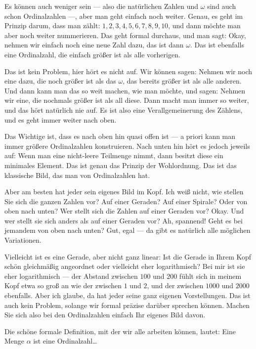 \begin{spoken-clean}[00:05:53 - 00:07:11]
Es können auch weniger sein --- also die natürlichen Zahlen und $\omega$ sind auch schon Ordinalzahlen ---, aber man geht einfach noch weiter. Genau, es geht im Prinzip darum, dass man zählt: $1, 2, 3, 4, 5, 6, 7, 8, 9, 10$, und dann möchte man aber noch weiter nummerieren. Das geht formal durchaus, und man sagt: Okay, nehmen wir einfach noch eine neue Zahl dazu, das ist dann $\omega$. Das ist ebenfalls eine Ordinalzahl, die einfach größer ist als alle vorherigen.

Das ist kein Problem, hier hört es nicht auf. Wir können sagen: Nehmen wir noch eine dazu, die noch größer ist als das $\omega$, das bereits größer ist als alle anderen. Und dann kann man das so weit machen, wie man möchte, und sagen: Nehmen wir eine, die nochmals größer ist als all diese. Dann macht man immer so weiter, und das hört natürlich nie auf. Es ist also eine Verallgemeinerung des Zählens, und es geht immer weiter nach oben.
\end{spoken-clean}

\begin{spoken-clean}[00:07:11 - 00:08:49]
Das Wichtige ist, dass es nach oben hin quasi offen ist --- a priori kann man immer größere Ordinalzahlen konstruieren. Nach unten hin hört es jedoch jeweils auf: Wenn man eine nicht-leere Teilmenge nimmt, dann besitzt diese ein minimales Element. Das ist genau das Prinzip der Wohlordnung. Das ist das klassische Bild, das man von Ordinalzahlen hat.

Aber am besten hat jeder sein eigenes Bild im Kopf. Ich weiß nicht, wie stellen Sie sich die ganzen Zahlen vor? Auf einer Geraden? Auf einer Spirale? Oder von oben nach unten? Wer stellt sich die Zahlen auf einer Geraden vor? Okay. Und wer stellt sie sich anders als auf einer Geraden vor? Ah, spannend! Geht es bei jemandem von oben nach unten? Gut, egal --- da gibt es natürlich alle möglichen Variationen.

Vielleicht ist es eine Gerade, aber nicht ganz linear: Ist die Gerade in Ihrem Kopf schön gleichmäßig angeordnet oder vielleicht eher logarithmisch? Bei mir ist sie eher logarithmisch --- der Abstand zwischen $100$ und $200$ fühlt sich in meinem Kopf etwa so groß an wie der zwischen $1$ und $2$, und der zwischen $1000$ und $2000$ ebenfalls. Aber ich glaube, da hat jeder seine ganz eigenen Vorstellungen. Das ist auch kein Problem, solange wir formal präzise darüber sprechen können. Machen Sie sich also bei den Ordinalzahlen einfach Ihr eigenes Bild davon.

Die schöne formale Definition, mit der wir alle arbeiten können, lautet: Eine Menge $\alpha$ ist eine Ordinalzahl\dots
\end{spoken-clean}


